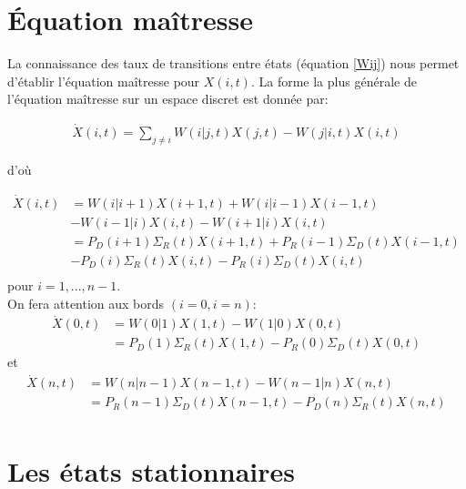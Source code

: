 \section{Équation maîtresse}

La connaissance des taux de transitions entre états (équation \ref{Wij}) nous permet d'établir l'équation maîtresse pour $X(i,t)$. La forme la plus générale de l'équation maîtresse sur un espace discret \citep{vankampen} est donnée par:

\begin{equation}
\begin{aligned}
\dot{X}(i,t)= \sum_{j\neq i} W(i|j,t)X(j,t)-W(j|i,t)X(i,t)
\label{MasterGeneral}
\end{aligned}
\end{equation}

d'où

\begin{equation}
\begin{aligned}
\dot{X}(i,t)&= W(i|i+1) X(i+1,t) + W(i|i-1) X(i-1,t)\\
					&-W(i-1|i) X(i,t) -W(i+1|i) X(i,t)\\
		    &= P_D(i+1) \Sigma_R(t) X(i+1,t) + P_R(i-1) \Sigma_D(t) X(i-1,t)\\
					&-P_D(i) \Sigma_R(t) X(i,t) -P_R(i) \Sigma_D(t) X(i,t)\\
\label{Master}
\end{aligned}
\end{equation}
pour $i = 1,...,n-1$.\\

On fera attention aux bords $(i=0, i=n)$:
\begin{equation}
\begin{aligned}
\dot{X}(0,t) 	&= W(0|1) X(1,t) - W(1|0) X(0,t)\\
				&= P_D(1) \Sigma_R(t) X(1,t) - P_R(0) \Sigma_D(t) X(0,t)
\label{bord0}
\end{aligned}
\end{equation}
 et 
\begin{equation}
\begin{aligned}
\dot{X}(n,t) 	&= W(n|n-1) X(n-1,t) - W(n-1|n) X(n,t)\\
				&= P_R(n-1) \Sigma_D(t) X(n-1,t)- P_D(n) \Sigma_R(t) X(n,t)\\
\label{bordN}
\end{aligned}
\end{equation}


\section{Les états stationnaires}

